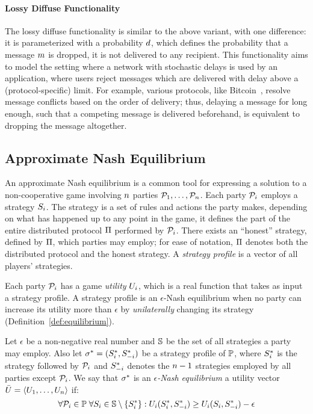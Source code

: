 \paragraph{Lossy Diffuse Functionality}\label{sec:lossy-network}
The lossy diffuse functionality is similar to the above variant, with one
difference: it is parameterized with a probability $d$, which
defines the probability that a message $m$ is dropped, \ie it is not
delivered to any recipient. This functionality aims to model the setting where
a network with stochastic delays is used by an application, where users reject
messages which are delivered with delay above a (protocol-specific) limit. For
example, various protocols, like Bitcoin~\cite{nakamoto2008bitcoin}, resolve
message conflicts based on the order of delivery; thus, delaying a message for
long enough, such that a competing message is delivered beforehand, is
equivalent to dropping the message altogether.

\subsection{Approximate Nash Equilibrium}\label{sec:equilibrium}

An approximate Nash equilibrium is a common tool for expressing a solution to a
non-cooperative game involving $n$ parties $\mathcal{P}_1,\ldots,\mathcal{P}_n$. Each party $\mathcal{P}_i$
employs a strategy $S_i$. The strategy is a set of rules and actions
the party makes, depending on what has happened up to any point in the game,
\ie it defines the part of the entire distributed protocol $\Pi$ performed
by $\mathcal{P}_i$. There exists an ``honest'' strategy, defined by $\Pi$, which
parties may employ; for ease of notation,
$\Pi$ denotes both the distributed protocol and the honest strategy.
A \emph{strategy profile} is a vector of all players' strategies.

Each party $\mathcal{P}_i$ has a game \emph{utility} $U_i$, which is a real
function that takes as input a strategy profile. A strategy profile is an
$\epsilon$-Nash equilibrium when no party can increase its utility more than
$\epsilon$ by \emph{unilaterally} changing its strategy
(Definition~\ref{def:equilibrium}).

\begin{definition}\label{def:equilibrium}
    Let $\epsilon$ be a non-negative real number and $\mathbb{S}$ be the set of all strategies a party may employ.
    Also let $\sigma^* = (S^*_i, S^*_{-i})$ be a strategy profile of
    $\mathbb{P}$, where $S^*_i$ is the strategy followed by $\mathcal{P}_i$ and $S^*_{-i}$ denotes the $n - 1$
    strategies employed by all parties except $\mathcal{P}_i$. We say that
    $\sigma^*$ is an \emph{$\epsilon$-Nash equilibrium} \wrt a utility vector $\bar{U} = \langle U_1, \ldots, U_n \rangle$ if:
    $$\forall \mathcal{P}_i \in \mathbb{P} \; \forall S_i \in \mathbb{S} \setminus \{ S^*_i \} : U_i(S^*_i, S^*_{-i}) \geq U_i(S_i, S^*_{-i}) - \epsilon$$
\end{definition}
